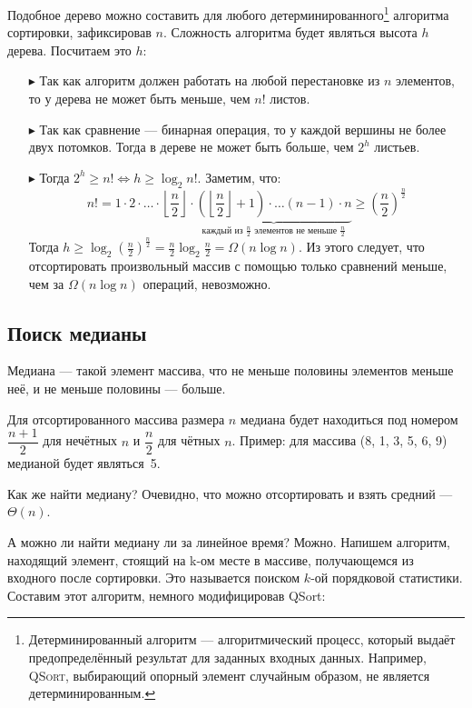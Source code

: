 Подобное дерево можно составить для любого детерминированного\footnote{Детерминированный алгоритм — алгоритмический процесс, который выдаёт предопределённый результат для заданных входных данных. Например, \textsc{QSort}, выбирающий опорный элемент случайным образом, не является детерминированным.} алгоритма сортировки, зафиксировав $n$. Сложность алгоритма будет являться высота $h$ дерева. Посчитаем это $h$:
\begin{itemize}
	\item[$\blacktriangleright$] Так как алгоритм должен работать на любой перестановке из $n$ элементов, то у дерева не может быть меньше, чем $n!$ листов.
	\item[$\blacktriangleright$] Так как сравнение --- бинарная операция, то у каждой вершины не более двух потомков. Тогда в дереве не может быть больше, чем $2^h$ листьев.
	\item[$\blacktriangleright$] Тогда $2^h \geqslant n! \iff h \geqslant \log_2 n!$.
	Заметим, что:
	\[n! = 1 \cdot 2 \cdot \ldots \cdot \left\lfloor\frac{n}{2}\right\rfloor \cdot \underbrace{ \left(\left\lfloor\frac{n}{2}\right\rfloor + 1\right) \cdot \ldots (n - 1) \cdot n}_\text{каждый из $\frac{n}{2}$ элементов не меньше $\frac{n}{2}$} \geqslant \left(\frac{n}{2}\right)^{\frac{n}{2}} \]
	Тогда $h \geqslant \log_2 \left(\frac{n}{2}\right)^{\frac{n}{2}} = \frac{n}{2} \log_2 \frac{n}{2} = \Omega(n \log n)$. Из этого следует, что отсортировать произвольный массив с помощью только сравнений меньше, чем за $\Omega(n \log n)$ операций, невозможно.
\end{itemize}

\subsection*{Поиск медианы}

Медиана --- такой элемент массива, что не меньше половины элементов меньше неё, и не меньше половины --- больше.

Для отсортированного массива размера $n$ медиана будет  находиться под номером $\dfrac{n + 1}{2}$ для нечётных $n$ и $\dfrac{n}{2}$ для чётных $n$.
Пример: для массива (8, 1, 3, 5, 6, 9) медианой будет являться~5.

Как же найти медиану?
Очевидно, что можно отсортировать и взять средний --- $\Theta(n)$.

А можно ли найти медиану ли за линейное время?
Можно.
Напишем алгоритм, находящий элемент, стоящий на k-ом месте в массиве, получающемся из входного после сортировки.
Это называется поиском $k$-ой порядковой статистики.
Составим этот алгоритм, немного модифицировав QSort:


